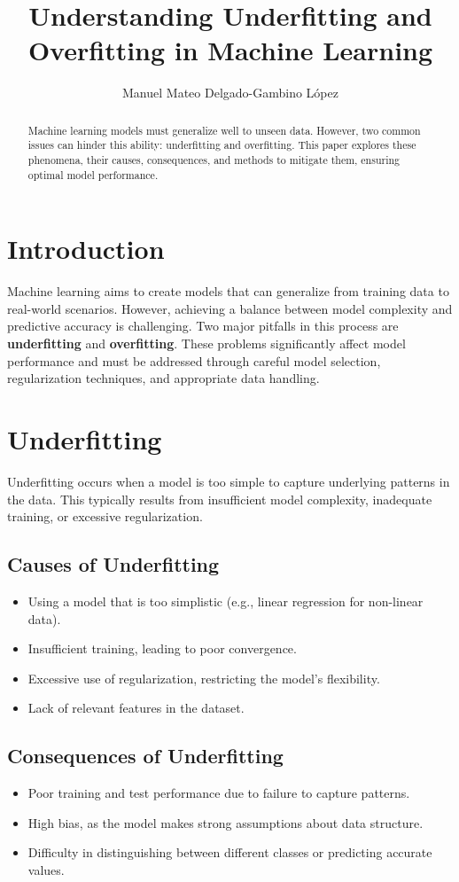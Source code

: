 \documentclass[conference]{IEEEtran}
\title{Understanding Underfitting and Overfitting in Machine Learning}
\author{Manuel Mateo Delgado-Gambino López}
\begin{document}
\maketitle

\begin{abstract}
Machine learning models must generalize well to unseen data. However, two common issues can hinder this ability: underfitting and overfitting. This paper explores these phenomena, their causes, consequences, and methods to mitigate them, ensuring optimal model performance.
\end{abstract}

\section{Introduction}
Machine learning aims to create models that can generalize from training data to real-world scenarios. However, achieving a balance between model complexity and predictive accuracy is challenging. Two major pitfalls in this process are \textbf{underfitting} and \textbf{overfitting}. These problems significantly affect model performance and must be addressed through careful model selection, regularization techniques, and appropriate data handling.

\section{Underfitting}
Underfitting occurs when a model is too simple to capture underlying patterns in the data. This typically results from insufficient model complexity, inadequate training, or excessive regularization.

\subsection{Causes of Underfitting}
\begin{itemize}
    \item Using a model that is too simplistic (e.g., linear regression for non-linear data).
    \item Insufficient training, leading to poor convergence.
    \item Excessive use of regularization, restricting the model's flexibility.
    \item Lack of relevant features in the dataset.
\end{itemize}

\subsection{Consequences of Underfitting}
\begin{itemize}
    \item Poor training and test performance due to failure to capture patterns.
    \item High bias, as the model makes strong assumptions about data structure.
    \item Difficulty in distinguishing between different classes or predicting accurate values.
\end{itemize}
\end{document}
